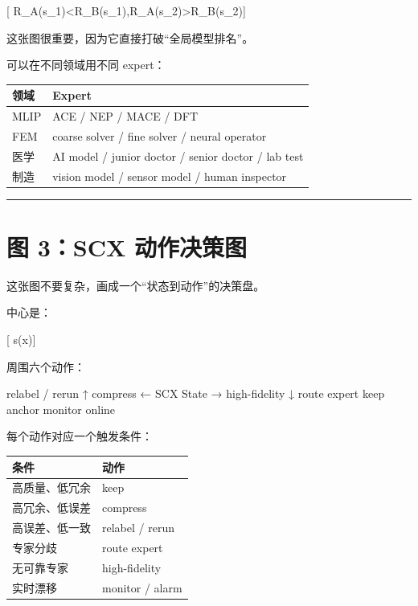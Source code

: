\documentclass[
  12pt,
]{ctexart}
\newenvironment{Shaded}{}{}
\newcommand{\NormalTok}[1]{#1}
\begin{document}
{[}
R\_A(s\_1)\textless R\_B(s\_1),\quad R\_A(s\_2)\textgreater R\_B(s\_2){]}

这张图很重要，因为它直接打破``全局模型排名''。

可以在不同领域用不同 expert：

\begin{longtable}[]{@{}ll@{}}
\toprule\noalign{}
领域 & Expert \\
\midrule\noalign{}
\endhead
\bottomrule\noalign{}
\endlastfoot
MLIP & ACE / NEP / MACE / DFT \\
FEM & coarse solver / fine solver / neural operator \\
医学 & AI model / junior doctor / senior doctor / lab test \\
制造 & vision model / sensor model / human inspector \\
\end{longtable}

\begin{center}\rule{0.5\linewidth}{0.5pt}\end{center}

\section{图 3：SCX
动作决策图}\label{ux56fe-3scx-ux52a8ux4f5cux51b3ux7b56ux56fe}

这张图不要复杂，画成一个``状态到动作''的决策盘。

中心是：

{[} s(x){]}

周围六个动作：

\begin{Shaded}
\begin{Highlighting}[]
\NormalTok{              relabel / rerun}
\NormalTok{                    ↑}
\NormalTok{compress ←    SCX State    → high{-}fidelity}
\NormalTok{                    ↓}
\NormalTok{              route expert}
\NormalTok{        keep anchor     monitor online}
\end{Highlighting}
\end{Shaded}

每个动作对应一个触发条件：

\begin{longtable}[]{@{}ll@{}}
\toprule\noalign{}
条件 & 动作 \\
\midrule\noalign{}
\endhead
\bottomrule\noalign{}
\endlastfoot
高质量、低冗余 & keep \\
高冗余、低误差 & compress \\
高误差、低一致 & relabel / rerun \\
专家分歧 & route expert \\
无可靠专家 & high-fidelity \\
实时漂移 & monitor / alarm \\
\end{longtable}
\end{document}
